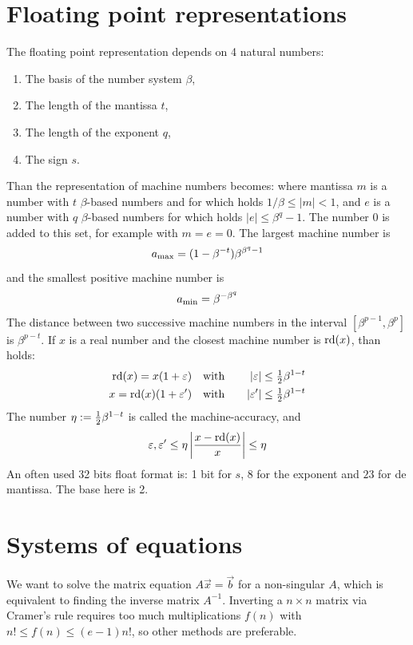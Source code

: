 \documentclass[twoside]{report}
\begin{document}
\section{Floating point representations}
The floating point representation depends on 4 natural numbers:
\begin{enumerate}
\item The basis of the number system $\beta$,
\item The length of the mantissa $t$,
\item The length of the exponent $q$,
\item The sign $s$.
\end{enumerate}
Than the representation of machine numbers becomes: 
where mantissa $m$ is a number with $t$ $\beta$-based numbers and for which holds
$1/\beta\leq|m|<1$, and $e$ is a number with $q$ $\beta$-based numbers for which
holds $|e|\leq\beta^q-1$. The number 0 is added to this set, for example with
$m=e=0$. The largest machine number is
\[
a_{\rm max}=(1-\beta^{-t})\beta^{\beta^q-1}
\]
and the smallest positive machine number is
\[
a_{\rm min}=\beta^{-\beta^q}
\]
The distance between two successive machine numbers in the interval
$[\beta^{p-1},\beta^p]$ is $\beta^{p-t}$. If $x$ is a real number and the
closest machine number is ${\rm rd}(x)$, than holds:
\begin{eqnarray*}
{\rm rd}(x)=x(1+\varepsilon) &~~~\mbox{with}~~~&|\varepsilon|\leq\mbox{$\frac{1}{2}$}\beta^{1-t}\\
x={\rm rd}(x)(1+\varepsilon')&~~~\mbox{with}~~~&|\varepsilon'|\leq\mbox{$\frac{1}{2}$}\beta^{1-t}
\end{eqnarray*}
The number $\eta:=\mbox{$\frac{1}{2}$}\beta^{1-t}$ is called the machine-accuracy, and
\[
\varepsilon,\varepsilon'\leq\eta\left|\frac{x-{\rm rd}(x)}{x}\right|\leq\eta
\]
An often used 32 bits float format is: 1 bit for $s$, 8 for the exponent
and $23$ for de mantissa. The base here is 2.

\section{Systems of equations}
We want to solve the matrix equation $A\vec{x}=\vec{b}$ for a non-singular
$A$, which is equivalent to finding the inverse matrix $A^{-1}$. Inverting
a $n\times n$ matrix via Cramer's rule requires too much multiplications
$f(n)$ with $n!\leq f(n)\leq (e-1)n!$, so other methods are preferable.
\end{document}
